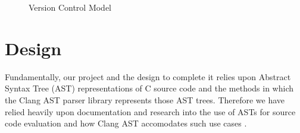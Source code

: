 \documentclass[11pt]{scrreprt}
\begin{document}
\begin{figure}[hp]
  \caption{Version Control Model}
  \label{fig:versioning}
\end{figure}

\section{Design}
Fundamentally, our project and the design to complete it relies upon Abstract Syntax Tree (AST) representations of C source code and the methods in which the Clang AST parser library represents those AST trees. Therefore we have relied heavily upon documentation and research into the use of ASTs for source code evaluation \cite{neamtiu2005understanding}\cite{pfenning1988higher} and how Clang AST accomodates such use cases \cite{lattner2008llvm}\cite{duffyexploiting}\cite{schaub2014comprehensive}.
\end{document}

